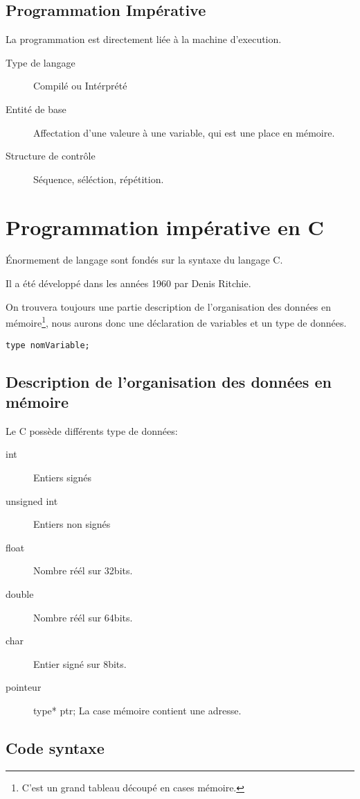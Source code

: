 \documentclass[12pt,a4paper,openany]{article}
\begin{document}
		\subsection{Programmation Impérative}
			La programmation est directement liée à la machine d'execution.
			\begin{description}	
				\item[Type de langage] Compilé ou Intérprété
				\item[Entité de base] Affectation d'une valeure à une variable, qui est une place en mémoire.
				\item[Structure de contrôle] Séquence, séléction, répétition.
			\end{description}

	\section{Programmation impérative en C}
	\'Enormement de langage sont fondés sur la syntaxe du langage C.

	Il a été développé dans les années 1960 par Denis Ritchie. %

	On trouvera toujours une partie description de l'organisation des données en mémoire\footnote{C'est un grand tableau découpé en cases mémoire.},
	nous aurons donc une déclaration de variables et un type de données.
	\begin{lstlisting}[caption=Syntaxe de déclaration de variable]
type nomVariable;		
	\end{lstlisting}
	\subsection{Description de l'organisation des données en mémoire}
	Le C possède différents type de données: 
	\begin{description}
		\item[int] Entiers signés
		\item[unsigned int] Entiers non signés 
		\item[float] Nombre réél sur 32bits. 
		\item[double] Nombre réél sur 64bits.
		\item[char] Entier signé sur 8bits.
		\item[pointeur] type* ptr; La case mémoire contient une adresse.
	\end{description}
	\subsection{Code syntaxe}
\end{document}
